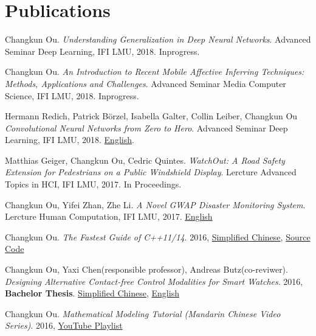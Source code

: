 \section{\textbf{Publications}}
 \resumeSubHeadingListStart
    \item{
      Changkun Ou.
      \emph{Understanding Generalization in Deep Neural Networks}.
      Advanced Seminar Deep Learning, IFI LMU, 2018. Inprogress. %
    }
    \item{
      Changkun Ou.
      \emph{An Introduction to Recent Mobile Affective Inferring Techniques: Methods, Applications and Challenges}.
      Advanced Seminar Media Computer Science, IFI LMU, 2018. Inprogress. %
    }
    \item{
      Hermann Redich, Patrick Börzel, Isabella Galter, Collin Leiber, Changkun Ou
      \emph{Convolutional Neural Networks from Zero to Hero}.
      Advanced Seminar Deep Learning, IFI LMU, 2018. \href{https://github.com/changkun/talks/blob/master/201712/cnn.pdf}{English}.
    }
    \item{
      Matthias Geiger, Changkun Ou, Cedric Quintes.
      \emph{WatchOut: A Road Safety Extension for Pedestrians on a Public Windshield Display}.
      Lercture Advanced Topics in HCI, IFI LMU, 2017. In Proceedings.
    }
    \item{
      Changkun Ou, Yifei Zhan, Zhe Li.
      \emph{A Novel GWAP Disaster Monitoring System}.
      Lercture Human Computation, IFI LMU, 2017.
      \href{https://github.com/changkun/hc-ss17-disaster-monitoring/blob/master/report/hc_final_project_report_team_Hotpot.pdf}{English}
    }
   \item{
       Changkun Ou.
       \emph{The Fastest Guide of C++11/14}. 
       2016, 
       \href{https://www.gitbook.com/book/changkun/cpp1x-tutorial/details}{Simplified Chinese}, 
       \href{https://github.com/changkun/cpp1x-tutorial}{Source Code}
   }
   \item{
       Changkun Ou, Yaxi Chen(responsible professor), Andreas Butz(co-reviwer).
       \emph{Designing Alternative Contact-free Control Modalities for Smart Watches}. 
       2016, \textbf{Bachelor Thesis}. \href{https://changkun.us/files/cv/bachelor-thesis-cn.html}{Simplified Chinese}, 
       \href{https://changkun.us/files/cv/bachelor-thesis-en.html}{English}
   }
   \item{
       Changkun Ou.
       \emph{Mathematical Modeling Tutorial (Mandarin Chinese Video Series)}.
       2016, \href{https://www.youtube.com/watch?v=EUfXE3vP9_A&list=PLwUqqMt5en7c7iZIseCVAS5BX6RPkS-qR}{YouTube Playlist}
   }
